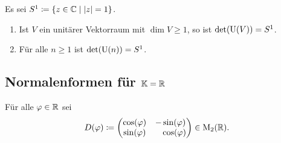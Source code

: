 \begin{corollary}
  Es sei $S^1 \coloneqq \{z \in \mathbb{C} \mid |z| = 1\}$.
  \begin{enumerate}[leftmargin=*, label=\roman*)]
    \item
      Ist $V$ ein unitärer Vektorraum mit $\dim V \geq 1$, so ist $\det(\mathrm{U}(V)) = S^1$.
    \item
      Für alle $n \geq 1$ ist $\det(\mathrm{U}(n)) = S^1$.
  \end{enumerate}
\end{corollary}










\subsection{Normalenformen für \texorpdfstring{$\mathbb{K} = \mathbb{R}$}{K = R}}


\begin{notation}
  Für alle $\varphi \in \mathbb{R}$ sei
  \[
    D(\varphi)
    \coloneqq
    \begin{pmatrix}
      \cos(\varphi) &          - \sin(\varphi)  \\
      \sin(\varphi) & \phantom{-}\cos(\varphi)
    \end{pmatrix}
    \in
    \mathrm{M}_2(\mathbb{R}).
  \]
\end{notation}


